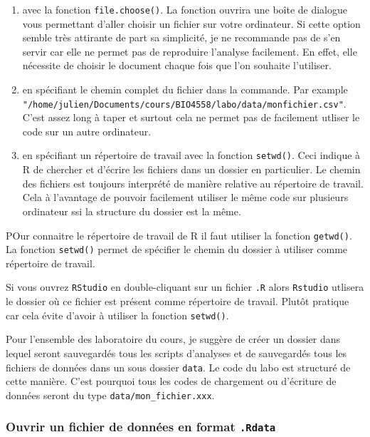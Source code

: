 \documentclass[12pt,]{book}
\makeatletter
\providecommand{\tightlist}{%
  \setlength{\itemsep}{0pt}\setlength{\parskip}{0pt}}
\newenvironment{kframe}{%
\medskip{}
\setlength{\fboxsep}{.8em}
 \def\at@end@of@kframe{}%
 \ifinner\ifhmode%
  \def\at@end@of@kframe{\end{minipage}}%
  \begin{minipage}{\columnwidth}%
 \fi\fi%
 \def\FrameCommand##1{\hskip\@totalleftmargin \hskip-\fboxsep
 \colorbox{shadecolor}{##1}\hskip-\fboxsep
     \hskip-\linewidth \hskip-\@totalleftmargin \hskip\columnwidth}%
 \MakeFramed {\advance\hsize-\width
   \@totalleftmargin\z@ \linewidth\hsize
   \@setminipage}}%
 {\par\unskip\endMakeFramed%
 \at@end@of@kframe}
\newenvironment{rmdblock}[1]
  {
  \begin{itemize}
  \renewcommand{\labelitemi}{
    \raisebox{-.7\height}[0pt][0pt]{
      {\setkeys{Gin}{width=3em,keepaspectratio}\texttt{[image: images/\#1]}}
    }
  }
  \setlength{\fboxsep}{1em}
  \begin{kframe}
  \item
  }
  {
  \end{kframe}
  \end{itemize}
  }
\newenvironment{rmdimportant}
  {\begin{rmdblock}{important}}
  {\end{rmdblock}}
\newenvironment{rmdtip}
  {\begin{rmdblock}{tip}}
  {\end{rmdblock}}
\makeatother
\begin{document}
\begin{enumerate}
\def\labelenumi{\arabic{enumi}.}
\tightlist
\item
  avec la fonction \texttt{file.choose()}. La fonction ouvrira une boîte de dialogue vous permettant d'aller choisir un fichier sur votre ordinateur. Si cette option semble très attirante de part sa simplicité, je ne recommande pas de s'en servir car elle ne permet pas de reproduire l'analyse facilement. En effet, elle nécessite de choisir le document chaque fois que l'on souhaite l'utiliser.
\item
  en spécifiant le chemin complet du fichier dans la commande. Par example \texttt{"/home/julien/Documents/cours/BIO4558/labo/data/monfichier.csv"}. C'est assez long à taper et surtout cela ne permet pas de facilement utliser le code sur un autre ordinateur.
\item
  en spécifiant un répertoire de travail avec la fonction \texttt{setwd()}. Ceci indique à R de chercher et d'écrire les fichiers dans un dossier en particulier. Le chemin des fichiers est toujours interprété de manière relative au répertoire de travail. Cela à l'avantage de pouvoir facilement utiliser le même code sur plusieurs ordinateur ssi la structure du dossier est la même.
\end{enumerate}

POur connaitre le répertoire de travail de R il faut utiliser la fonction \texttt{getwd()}. La fonction \texttt{setwd()} permet de spécifier le chemin du dossier à utiliser comme répertoire de travail.

\begin{rmdtip}
Si vous ouvrez \texttt{RStudio} en double-cliquant sur un fichier \texttt{.R} alors \texttt{Rstudio} utlisera le dossier où ce fichier est présent comme répertoire de travail. Plutôt pratique car cela évite d'avoir à utiliser la fonction \texttt{setwd()}.
\end{rmdtip}

\begin{rmdimportant}
Pour l'ensemble des laboratoire du cours, je suggère de créer un dossier dans lequel seront sauvegardés tous les scripts d'analyses et de sauvegardés tous les fichiers de données dans un sous dossier \texttt{data}. Le code du labo est structuré de cette manière. C'est pourquoi tous les codes de chargement ou d'écriture de données seront du type \texttt{data/mon\_fichier.xxx}.
\end{rmdimportant}

\hypertarget{ouvrir-un-fichier-de-donnuxe9es-en-format-.rdata}{%
\subsubsection{\texorpdfstring{Ouvrir un fichier de données en format \texttt{.Rdata}}{Ouvrir un fichier de données en format .Rdata}}\label{ouvrir-un-fichier-de-donnuxe9es-en-format-.rdata}}
\end{document}
